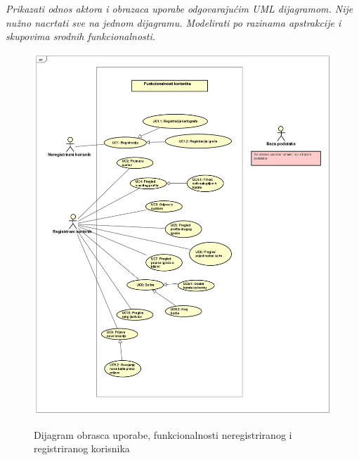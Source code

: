 					\textit{Prikazati odnos aktora i obrazaca uporabe odgovarajućim UML dijagramom. Nije nužno nacrtati sve na jednom dijagramu. Modelirati po razinama apstrakcije i skupovima srodnih funkcionalnosti.}
				\eject		
					\begin{figure}[H]
					\centering
					\includegraphics[scale=0.42]{dijagrami/funkcionalnosti_korisnika} \\
					\caption{Dijagram obrasca uporabe, funkcionalnosti neregistriranog i registriranog korisnika}
					\label{fig:funkcionalnosti_korisnika}
				\end{figure}
			
